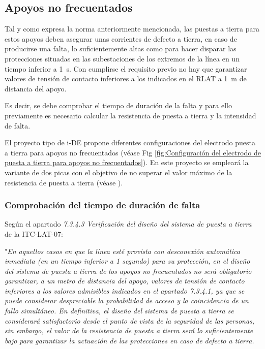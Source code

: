 
\subsection{Apoyos no frecuentados}
\label{subsec:pat-apoyosNF}
Tal y como expresa la norma anteriormente mencionada, las puestas a tierra para estos apoyos deben asegurar unas corrientes de defecto a tierra, en caso de producirse una falta, lo suficientemente altas como para hacer disparar las protecciones situadas en las subestaciones de los extremos de la línea en un tiempo inferior a \SI{1}{\second}. Con cumplirse el requisito previo no hay que garantizar valores de tensión de contacto inferiores a los indicados en el \ac{RLAT} a \SI{1}{\meter} de distancia del apoyo. 

Es decir, se debe comprobar el tiempo de duración de la falta y para ello previamente es necesario calcular la resistencia de puesta a tierra y la intensidad de falta.

El proyecto tipo de \ac{i-DE} propone diferentes configuraciones del electrodo puesta a tierra para apoyos no frecuentados (véase Fig \ref{fig:Configuración del electrodo de puesta a tierra para apoyos no frecuentados}). En este proyecto se empleará la variante de dos picas con el objetivo de no superar el valor máximo de la resistencia de puesta a tierra (véase ).


\subsubsection{Comprobación del tiempo de duración de falta}
\label{subsubsec:apoyosNF-tiempo-pat}
Según el apartado \textit{7.3.4.3 Verificación del diseño del sistema de puesta a tierra} de la ITC-LAT-07:

"\textit{En aquellos casos en que la línea esté provista con desconexión automática inmediata (en un tiempo inferior a 1 segundo) para su protección, en el diseño del sistema de puesta a tierra de los apoyos no frecuentados no será obligatorio garantizar, a un metro de distancia del apoyo, valores de tensión de contacto inferiores a los valores admisibles indicados en el apartado 7.3.4.1, ya que se puede considerar despreciable la probabilidad de acceso y la coincidencia de un fallo simultáneo. En definitiva, el diseño del sistema de puesta a tierra se considerará satisfactorio desde el punto de vista de la seguridad de las personas, sin embargo, el valor de la resistencia de puesta a tierra será lo suficientemente bajo para garantizar la actuación de las protecciones en caso de defecto a tierra.}

